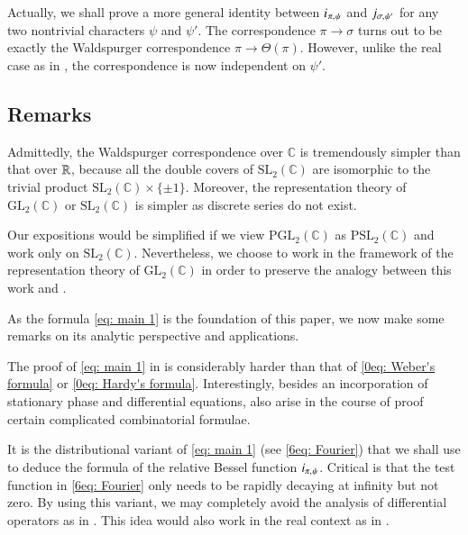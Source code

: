 \documentclass{amsproc}
\newcommand{\BC}{{\mathbb {C}}} \newcommand{\BD}{{\mathbb {D}}}
\newcommand{\GL}{{\mathrm {GL}}} \newcommand{\PGL}{{\mathrm {PGL}}}
\newcommand{\SL}{{\mathrm {SL}}} \newcommand{\PSL}{{\mathrm {PSL}}}
\newcommand{\ra}{\rightarrow}
\def\bfJ {\boldsymbol J}
\def\shskip{\hskip 0.5 pt}
\theoremstyle{plain}
\numberwithin{equation}{section}
\begin{document}
	Actually, we shall prove a more general identity between $i_{\hskip 0.5 pt \pi, \hskip 0.5 pt \psi}$ and $j_{\sigma, \hskip 0.5 pt \psi '}$ for any two nontrivial characters $\psi$ and $\psi'$.
The correspondence $\pi \ra \sigma  $ turns out  to be exactly the
Waldspurger correspondence $\pi \ra \Theta (\pi)$. However, unlike the real case as in \cite{BaruchMao-Real}, the correspondence is now independent on $\psi'$.


	\subsection{Remarks}
	
	Admittedly, the Waldspurger correspondence over $\BC$ is tremendously simpler than that over ${\mathbb {R}}$, because all the double covers of $\SL_2 (\BC)$ are isomorphic to the trivial product $\SL_2 (\BC) \times \{\pm 1 \}$. Moreover, the representation theory of $\GL_2 (\BC)$ or $\SL_2 (\BC)$ is simpler as discrete series do not exist.
	
	Our expositions would be simplified if we view $\PGL_2 (\BC)$ as $\PSL_2 (\BC)$ and work only on $\SL_2 (\BC)$. Nevertheless, we choose to work in the framework of the representation theory of $\GL_2 (\BC)$ in order to preserve the analogy  between this work and \cite{BaruchMao-Real}.
	
	As the formula \eqref{eq: main 1} is the foundation of this paper, we now make some remarks on its analytic perspective and applications.
	
	The proof of \eqref{eq: main 1} in \cite{Qi-II-G} is considerably harder than that of \eqref{0eq: Weber's formula} or \eqref{0eq: Hardy's formula}. Interestingly, besides an incorporation of stationary phase and differential equations, also arise in the course of proof certain complicated combinatorial formulae.
	
	It is the distributional variant of \eqref{eq: main 1} (see \eqref{6eq: Fourier}) that we shall use to deduce the formula of the relative Bessel function $i_{\pi, \shskip \psi}$. Critical is that the test function in \eqref{6eq: Fourier} only needs to be rapidly decaying at infinity but not zero.  By using this variant, we may
completely avoid the analysis of  differential operators as in \cite{BaruchMao-Real}. This idea would also work in the real context as in \cite{BaruchMao-Real}.
	
\end{document}
